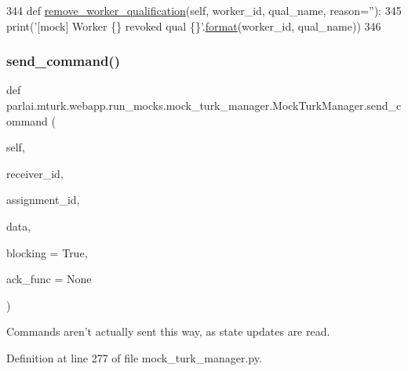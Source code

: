 \begin{DoxyCode}
344     \textcolor{keyword}{def }\hyperlink{namespaceparlai_1_1mturk_1_1core_1_1dev_1_1mturk__utils_abc2c057b91641179f7c4bb50dd916488}{remove\_worker\_qualification}(self, worker\_id, qual\_name, reason=''):
345         print(\textcolor{stringliteral}{'[mock] Worker \{\} revoked qual \{\}'}.\hyperlink{namespaceparlai_1_1chat__service_1_1services_1_1messenger_1_1shared__utils_a32e2e2022b824fbaf80c747160b52a76}{format}(worker\_id, qual\_name))
346 
\end{DoxyCode}
\mbox{\label{classparlai_1_1mturk_1_1webapp_1_1run__mocks_1_1mock__turk__manager_1_1MockTurkManager_a986d0bdeec4969b35e47c0766c3db571}} 
\subsubsection{\texorpdfstring{send\+\_\+command()}{send\_command()}}
{\footnotesize\ttfamily def parlai.\+mturk.\+webapp.\+run\+\_\+mocks.\+mock\+\_\+turk\+\_\+manager.\+Mock\+Turk\+Manager.\+send\+\_\+command (\begin{DoxyParamCaption}\item[{}]{self,  }\item[{}]{receiver\+\_\+id,  }\item[{}]{assignment\+\_\+id,  }\item[{}]{data,  }\item[{}]{blocking = {\ttfamily True},  }\item[{}]{ack\+\_\+func = {\ttfamily None} }\end{DoxyParamCaption})}

\begin{DoxyVerb}Commands aren't actually sent this way, as state updates are read.
\end{DoxyVerb}
 

Definition at line 277 of file mock\+\_\+turk\+\_\+manager.\+py.



